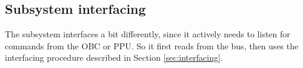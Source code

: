 \subsection{Subsystem interfacing}
\label{sec:subsystem_interfacing}
The subsystem interfaces a bit differently, since it actively needs to listen for commands from the OBC or PPU. So it first reads from the bus, then uses the interfacing procedure described in Section \ref{sec:interfacing}.


